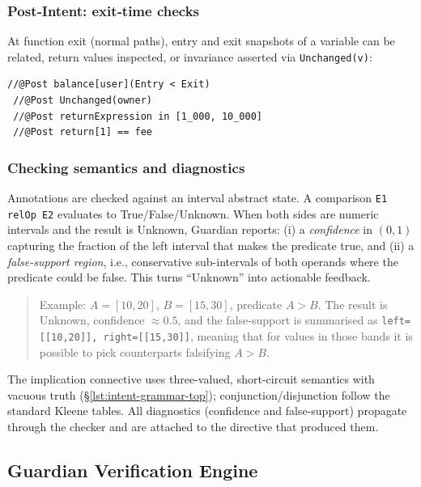 \documentclass[10pt, conference]{IEEEtran}
\begin{document}
\subsubsection{Post‑Intent: exit‑time checks}
%
At function exit (normal paths), entry and exit snapshots of a
variable can be related, return values inspected, or invariance
asserted via \verb|Unchanged(v)|:
\begin{lstlisting}[language=Solidity,basicstyle=\scriptsize\ttfamily]
 //@Post balance[user](Entry < Exit)
 //@Post Unchanged(owner)
 //@Post returnExpression in [1_000, 10_000]
 //@Post return[1] == fee
\end{lstlisting}

\subsubsection{Checking semantics and diagnostics}
%
Annotations are checked against an interval abstract state.  A
comparison \verb|E1 relOp E2| evaluates to
\textsf{True}/\textsf{False}/\textsf{Unknown}.
When both sides are numeric intervals and the result is
\textsf{Unknown}, Guardian reports:
(i) a \emph{confidence} in $(0,1)$ capturing the fraction of the
left interval that makes the predicate true, and
(ii) a \emph{false-support region}, i.e., conservative sub-intervals
of both operands where the predicate could be false.  This turns
“Unknown” into actionable feedback.

\begin{quote}\small
Example:
$A=[10,20]$, $B=[15,30]$, predicate $A>B$.
The result is \textsf{Unknown}, confidence $\approx 0.5$,
and the false-support is summarised as
\verb|left=[[10,20]], right=[[15,30]]|, meaning that for values in
those bands it is possible to pick counterparts falsifying $A>B$.
\end{quote}

\noindent
The implication connective uses three-valued, short-circuit
semantics with vacuous truth (\S\ref{lst:intent-grammar-top});
conjunction/disjunction follow the standard Kleene tables.
All diagnostics (confidence and false-support) propagate through
the checker and are attached to the directive that produced them.



\subsection{Guardian Verification Engine}
\end{document}
